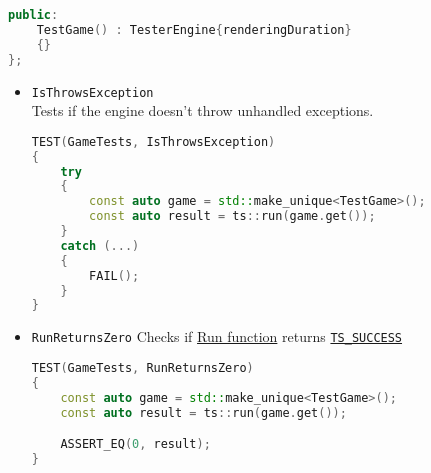 \begin{itemize}
\begin{lstlisting}[language=c++, caption=TestGame class (./engine/tests/tester.cpp)]
public:
    TestGame() : TesterEngine{renderingDuration}
    {}
};
\end{lstlisting}
        \begin{itemize}
            \item \texttt{IsThrowsException}\\
            Tests if the engine doesn't throw unhandled exceptions.
\begin{lstlisting}[language=c++, caption=IsThrowsException test(./engine/tests/tester.cpp)]
TEST(GameTests, IsThrowsException)
{
    try
    {
        const auto game = std::make_unique<TestGame>();
        const auto result = ts::run(game.get());
    }
    catch (...)
    {
        FAIL();
    }
}
\end{lstlisting}
            \item \texttt{RunReturnsZero}
            Checks if \hyperref[sec:run_fun]{Run function} returns \hyperref[sec:return_codes]{\texttt{TS\_SUCCESS}} 
\begin{lstlisting}[language=c++, caption=RunReturnsZero test(./engine/tests/tester.cpp)]
TEST(GameTests, RunReturnsZero)
{
    const auto game = std::make_unique<TestGame>();
    const auto result = ts::run(game.get());

    ASSERT_EQ(0, result);
}
            \end{lstlisting}
        \end{itemize}
\end{itemize}